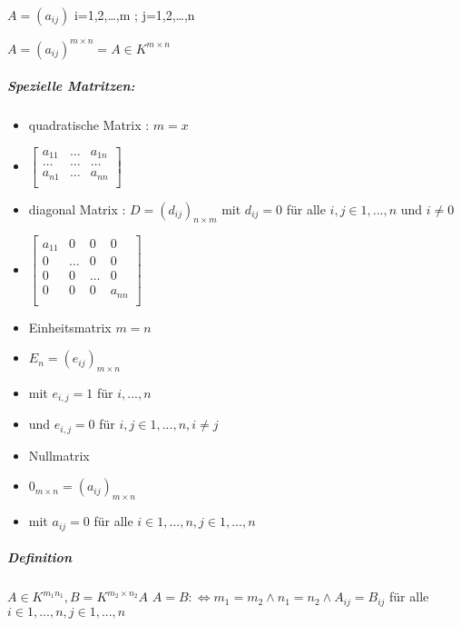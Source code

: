 \documentclass{../tudscript}
\begin{document}
\(A = (a_{ij})\) i=1,2,\ldots{},m ; j=1,2,\ldots{},n

\(A = (a_{ij})^{m \times n}= A \in K^{m \times n}\)

\hypertarget{spezielle-matritzen}{%
\subparagraph{Spezielle Matritzen:}\label{spezielle-matritzen}}

\begin{itemize}
\item
  quadratische Matrix : \(m=x\)
\item
  \(\begin{bmatrix}  a_{11} & \dots & a_{1n} \\  \dots & \dots & \dots \\  a_{n1} & \dots & a_{nn}\\  \end{bmatrix}\)
\item
  diagonal Matrix : \(D=(d_{ij})_{n \times m}\) mit \(d_{ij}=0\) für
  alle \(i,j \in {1,...,n}\) und \(i\neq 0\)
\item
  \(\begin{bmatrix}  a_{11} & 0 & 0 & 0 \\  0 & \dots & 0 & 0 \\  0 & 0 & \dots & 0 \\  0 & 0 & 0 & a_{nn}\\ \end{bmatrix}\)
\item
  Einheitsmatrix \(m=n\)
\item
  \(E_n = (e_{ij})_{m \times n}\)
\item
  mit \(e_{i,j}=1\) für \(i,...,n\)
\item
  und \(e_{i,j}=0\) für \(i,j \in {1,...,n}, i\neq j\)
\item
  Nullmatrix
\item
  \(0_{m\times n}=(a_{ij})_{m \times n}\)
\item
  mit \(a_{ij}=0\) für alle \(i \in {1,...,n}, j \in {1,...,n}\)
\end{itemize}

\hypertarget{definition-1}{%
\subparagraph{Definition}\label{definition-1}}

\(A\in K ^{m_1n_1}, B = K^{m_2 \times n_2} A\)
\(A=B :\iff m_1 = m_2 \wedge n_1=n_2 \wedge A_{ij}=B_{ij}\) für alle
\(i\in {1,...,n},j\in {1,...,n}\)

\hypertarget{rechnen-mit-matritzen}{%
\label{rechnen-mit-matritzen}}
\end{document}
